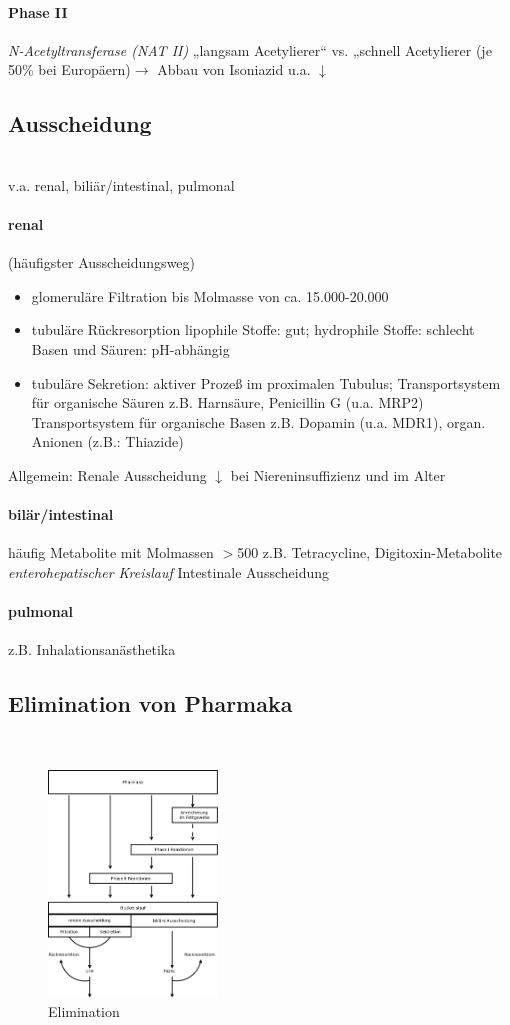 \documentclass[10pt,a4paper]{report}
\begin{document}
\paragraph{Phase II}
\textit{N-Acetyltransferase (NAT II)}		„langsam Acetylierer“ vs. „schnell Acetylierer (je 50\% bei Europäern)$\rightarrow$ Abbau von Isoniazid u.a. $\downarrow$
\subsection{Ausscheidung} \mbox{} \\
v.a. renal, biliär/intestinal, pulmonal
\paragraph{renal}
(häufigster Ausscheidungsweg)
\begin{itemize}
	\item glomeruläre Filtration bis Molmasse von ca. 15.000-20.000
	\item tubuläre Rückresorption lipophile Stoffe: gut; hydrophile Stoffe: schlecht Basen und Säuren: pH-abhängig
	\item tubuläre Sekretion: aktiver Prozeß im proximalen Tubulus; Transportsystem für organische Säuren z.B. Harnsäure, Penicillin G (u.a. MRP2) Transportsystem für organische Basen z.B. Dopamin (u.a. MDR1), organ. Anionen (z.B.: Thiazide)
\end{itemize}
Allgemein: Renale Ausscheidung $\downarrow$ bei Niereninsuffizienz und im Alter
\paragraph{bilär/intestinal} häufig Metabolite mit Molmassen $>$500 z.B. Tetracycline, Digitoxin-Metabolite
\textit{enterohepatischer Kreislauf} Intestinale Ausscheidung
\paragraph{pulmonal}
z.B. Inhalationsanästhetika
\subsection{Elimination von Pharmaka} \mbox{} \\
\begin{figure}[h]
	\centering 
	\includegraphics[width=0.4\textwidth]{Elimination.png} 
	\caption{Elimination} 
	\label{fig:Elimination}
\end{figure}
\end{document}
